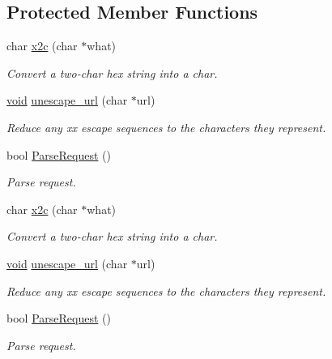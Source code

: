 \subsection*{\-Protected \-Member \-Functions}
\begin{DoxyCompactItemize}
\item 
char \hyperlink{class_c_g_i_c_plus_plus_a52641ea9cc0d1e4862e8d7c488f8a81b}{x2c} (char $\ast$what)
\begin{DoxyCompactList}\small\item\em \-Convert a two-\/char hex string into a char. \end{DoxyCompactList}\item 
\hyperlink{_cpclient_8h_a6464f7480a0fd0ee170cba12b2c0497f}{void} \hyperlink{class_c_g_i_c_plus_plus_a3f269cbf0c5a66de7fa1fdadf5a4bb26}{unescape\-\_\-url} (char $\ast$url)
\begin{DoxyCompactList}\small\item\em \-Reduce any xx escape sequences to the characters they represent. \end{DoxyCompactList}\item 
bool \hyperlink{class_c_g_i_c_plus_plus_a12301e8929d6ef34d219152b442bdb06}{\-Parse\-Request} ()
\begin{DoxyCompactList}\small\item\em \-Parse request. \end{DoxyCompactList}\item 
char \hyperlink{class_c_g_i_c_plus_plus_a52641ea9cc0d1e4862e8d7c488f8a81b}{x2c} (char $\ast$what)
\begin{DoxyCompactList}\small\item\em \-Convert a two-\/char hex string into a char. \end{DoxyCompactList}\item 
\hyperlink{_cpclient_8h_a6464f7480a0fd0ee170cba12b2c0497f}{void} \hyperlink{class_c_g_i_c_plus_plus_a3f269cbf0c5a66de7fa1fdadf5a4bb26}{unescape\-\_\-url} (char $\ast$url)
\begin{DoxyCompactList}\small\item\em \-Reduce any xx escape sequences to the characters they represent. \end{DoxyCompactList}\item 
bool \hyperlink{class_c_g_i_c_plus_plus_a12301e8929d6ef34d219152b442bdb06}{\-Parse\-Request} ()
\begin{DoxyCompactList}\small\item\em \-Parse request. \end{DoxyCompactList}\end{DoxyCompactItemize}
